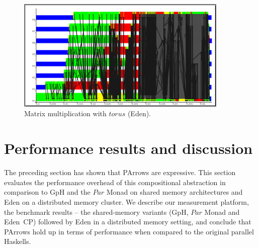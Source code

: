 \documentclass{jfp1}
\newcommand{\Conid}[1]{\mathit{#1}}
\newcommand{\Varid}[1]{\mathit{#1}}
\begin{document}
\begin{figure}[tb]
	\centering
	\includegraphics[width=0.9\textwidth]{images/torus_matrix_eden_scale}
	\caption[Matrix multiplication with \ensuremath{\Varid{torus}} (Eden)]{Matrix multiplication with \ensuremath{\Varid{torus}} (Eden).}
	\label{fig:torus_eden_trace}
\end{figure}


	
%
\section{Performance results and discussion}
\label{sec:benchmarks}

The preceding section has shown that PArrows are expressive. This section evaluates the performance overhead of this compositional abstraction in comparison to  GpH and the \ensuremath{\Conid{Par}} Monad on shared memory architectures and Eden on  a distributed memory cluster.
We describe our measurement platform, the benchmark results -- the shared-memory variants (GpH, \ensuremath{\Conid{Par}} Monad and Eden~CP) followed by Eden in a distributed memory setting, and conclude that PArrows hold up in terms of performance when compared to the original parallel Haskells.


\newcommand{\rmtest}{Rabin--Miller test\xspace}
\newcommand{\sudokutest}{Sudoku\xspace}
\newcommand{\jacobitest}{Jacobi sum test\xspace}
\newcommand{\torustest}{Gentleman\xspace}
\newlength{\plotwidthSMP}
\setlength{\plotwidthSMP}{0.39\textwidth}
\newlength{\plotwidthDist}
\setlength{\plotwidthDist}{0.6\textwidth}

\newcommand{\benchmarkDir}{benchmarks}

\newcommand{\speedupplot}[8]{
\begin{tikzpicture}
\begin{axis}[title={#1},
title style={align=center},
scale only axis, width=#7,
xlabel=Threads,
xtick distance=#4,
ytick distance=#4,
ylabel=Speedup,
ylabel near ticks,
grid=major,
legend entries={linear, #2},
legend style={at={(0.01,0.99)},anchor=north west},
max space between ticks=50pt,
grid style={line width=.1pt, draw=gray!10},
major grid style={line width=.2pt,draw=gray!50},
ymin=-1,
xmin=-1,
ymax=#8,
xmax=#6]
\addplot [domain=0:#3, no markers,dotted,thick]{x};
#5
\end{axis}
\end{tikzpicture}
}
\end{document}
